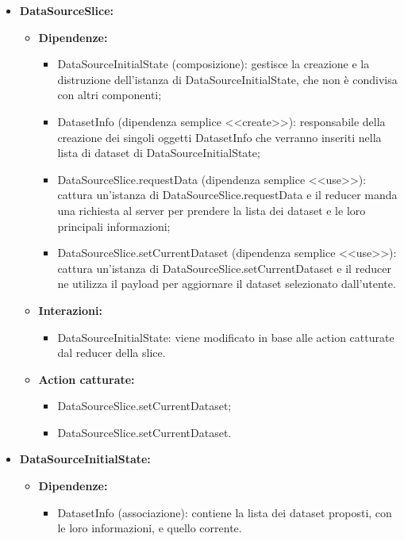 \begin{itemize}
    \item \textbf{DataSourceSlice:}
    \begin{itemize}
        \item \textbf{Dipendenze:}
        \begin{itemize}
            \item DataSourceInitialState (composizione): gestisce la creazione e la distruzione dell'istanza di DataSourceInitialState, che non è condivisa con altri componenti;
            \item DatasetInfo (dipendenza semplice <<create>>):  responsabile della creazione dei singoli oggetti DatasetInfo che verranno inseriti nella lista di dataset di DataSourceInitialState;
            \item DataSourceSlice.requestData (dipendenza semplice <<use>>): cattura un'istanza di DataSourceSlice.requestData e il reducer manda una richiesta al server per prendere la lista dei dataset e le loro principali informazioni;
            \item DataSourceSlice.setCurrentDataset (dipendenza semplice <<use>>): cattura un'istanza di DataSourceSlice.setCurrentDataset e il reducer ne utilizza il payload per aggiornare il dataset selezionato dall'utente.
        \end{itemize} 
        \item \textbf{Interazioni:}
        \begin{itemize}
            \item DataSourceInitialState: viene modificato in base alle action catturate dal reducer della slice.
        \end{itemize} 
        \item \textbf{Action catturate:}
        \begin{itemize}
            \item DataSourceSlice.setCurrentDataset;
            \item DataSourceSlice.setCurrentDataset.
        \end{itemize} 
    \end{itemize}

    
    \item \textbf{DataSourceInitialState:}
    \begin{itemize}
        \item \textbf{Dipendenze:}
        \begin{itemize}
            \item DatasetInfo (associazione): contiene la lista dei dataset proposti, con le loro informazioni, e quello corrente.
        \end{itemize} 
    \end{itemize}


\end{itemize}
